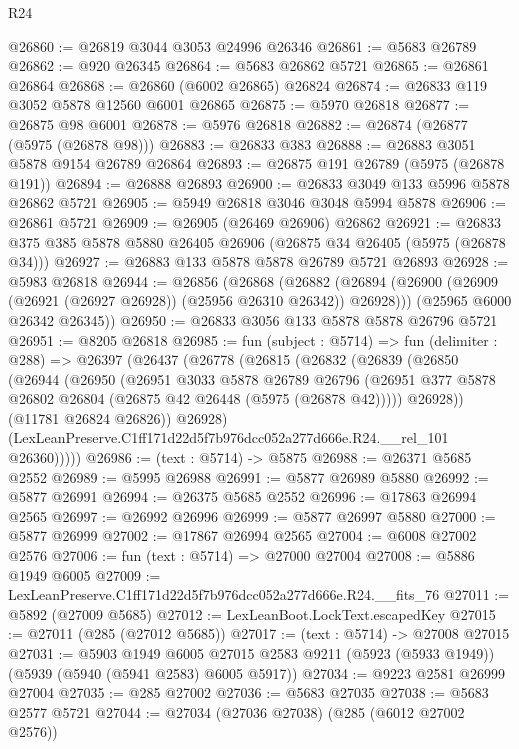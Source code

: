 \begin{lexlean}{R24}
\begin{coremodule}
@26860 := @26819 @3044 @3053 @24996 @26346
@26861 := @5683 @26789
@26862 := @920 @26345
@26864 := @5683 @26862 @5721
@26865 := @26861 @26864
@26868 := @26860 (@6002 @26865) @26824
@26874 := @26833 @119 @3052 @5878 @12560 @6001 @26865
@26875 := @5970 @26818
@26877 := @26875 @98 @6001
@26878 := @5976 @26818
@26882 := @26874 (@26877 (@5975 (@26878 @98)))
@26883 := @26833 @383
@26888 := @26883 @3051 @5878 @9154 @26789 @26864
@26893 := @26875 @191 @26789 (@5975 (@26878 @191))
@26894 := @26888 @26893
@26900 := @26833 @3049 @133 @5996 @5878 @26862 @5721
@26905 := @5949 @26818 @3046 @3048 @5994 @5878
@26906 := @26861 @5721
@26909 := @26905 (@26469 @26906) @26862
@26921 := @26833 @375 @385 @5878 @5880 @26405 @26906 (@26875 @34 @26405 (@5975 (@26878 @34)))
@26927 := @26883 @133 @5878 @5878 @26789 @5721 @26893
@26928 := @5983 @26818
@26944 := @26856
    (@26868
      (@26882 (@26894 (@26900 (@26909 (@26921 (@26927 @26928)) (@25956 @26310 @26342)) @26928)))
      (@25965 @6000 @26342 @26345))
@26950 := @26833 @3056 @133 @5878 @5878 @26796 @5721
@26951 := @8205 @26818
@26985 := fun (subject : @5714) =>
  fun (delimiter : @288) =>
  @26397
    (@26437
      (@26778
        (@26815
          (@26832
            (@26839
              (@26850
                (@26944
                  (@26950
                    (@26951
                      @3033
                      @5878
                      @26789
                      @26796
                      (@26951 @377 @5878 @26802 @26804 (@26875 @42 @26448 (@5975 (@26878 @42)))))
                    @26928))
                (@11781 @26824 @26826))
              @26928)
            (LexLeanPreserve.C1ff171d22d5f7b976dcc052a277d666e.R24.__rel_101 @26360)))))
@26986 := (text : @5714) -> @5875
@26988 := @26371 @5685 @2552
@26989 := @5995 @26988
@26991 := @5877 @26989 @5880
@26992 := @5877 @26991
@26994 := @26375 @5685 @2552
@26996 := @17863 @26994 @2565
@26997 := @26992 @26996
@26999 := @5877 @26997 @5880
@27000 := @5877 @26999
@27002 := @17867 @26994 @2565
@27004 := @6008 @27002 @2576
@27006 := fun (text : @5714) => @27000 @27004
@27008 := @5886 @1949 @6005
@27009 := LexLeanPreserve.C1ff171d22d5f7b976dcc052a277d666e.R24.__fits_76
@27011 := @5892 (@27009 @5685)
@27012 := LexLeanBoot.LockText.escapedKey
@27015 := @27011 (@285 (@27012 @5685))
@27017 := (text : @5714) -> @27008 @27015
@27031 := @5903
    @1949
    @6005
    @27015
    @2583
    @9211
    (@5923 (@5933 @1949))
    (@5939 (@5940 (@5941 @2583) @6005 @5917))
@27034 := @9223 @2581 @26999 @27004
@27035 := @285 @27002
@27036 := @5683 @27035
@27038 := @5683 @2577 @5721
@27044 := @27034 (@27036 @27038) (@285 (@6012 @27002 @2576))

\end{coremodule}
\end{lexlean}

